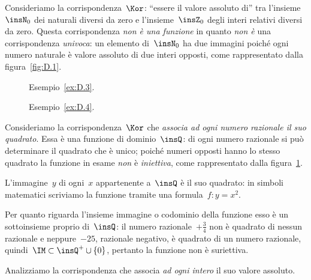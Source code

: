 \begin{exrig}
 \begin{esempio}
 \label{ex:D.3}
Consideriamo la corrispondenza~$\Kor$: ``essere il valore assoluto di'' tra
l'insieme~$\insN_0$ dei naturali diversi da zero e l'insieme~$\insZ_0$ degli 
interi
relativi diversi da zero. Questa corrispondenza \emph{non è una
funzione} in quanto \emph{non è} una corrispondenza \emph{univoca}: un elemento 
di~$\insN_0$ ha due immagini
poiché ogni numero naturale è valore assoluto di due interi
opposti, come rappresentato dalla figura~\ref{fig:D.1}.
\end{esempio}

\begin{inaccessibleblock}
 \begin{figure}[b]
 \begin{minipage}[t]{.45\textwidth}
\centering
 
\caption{Esempio~\ref{ex:D.3}.}\label{fig:D.1}
 \end{minipage}\hfil
 \begin{minipage}[t]{.45\textwidth}
\centering
 
\caption{Esempio~\ref{ex:D.4}.}\label{fig:D.2}
 \end{minipage}
\end{figure}
\end{inaccessibleblock}

 \begin{esempio}
 \label{ex:D.4}
 Consideriamo la corrispondenza~$\Kor$ che \emph{associa ad ogni numero 
razionale il suo quadrato}. Essa è una funzione di
dominio~$\insQ$: di ogni numero razionale si può
determinare il quadrato che è unico; poiché numeri opposti hanno lo
stesso quadrato la funzione in esame \emph{non} è
\emph{iniettiva}, come rappresentato dalla figura~\ref{fig:D.2}.

L'immagine~$y$ di ogni~$x$ appartenente a~$\insQ$ è il suo
quadrato: in simboli matematici scriviamo la funzione tramite una
formula~$f: y = x^{2}$.

Per quanto riguarda l'insieme immagine o
codominio della funzione esso è un sottoinsieme proprio di~$\insQ$: il numero 
razionale~$+{\frac{3}{4}}$ non è quadrato di
nessun razionale e neppure~$-25$, razionale negativo, è quadrato di
un numero razionale, quindi~$\IM\subset\insQ^{+}\cup\{0\}$, pertanto la funzione 
non è suriettiva.
 \end{esempio}

 \begin{esempio}
 \label{ex:D.5}
 Analizziamo la corrispondenza che associa \emph{ad ogni intero} il suo valore 
assoluto.


\end{esempio}
\end{exrig}

